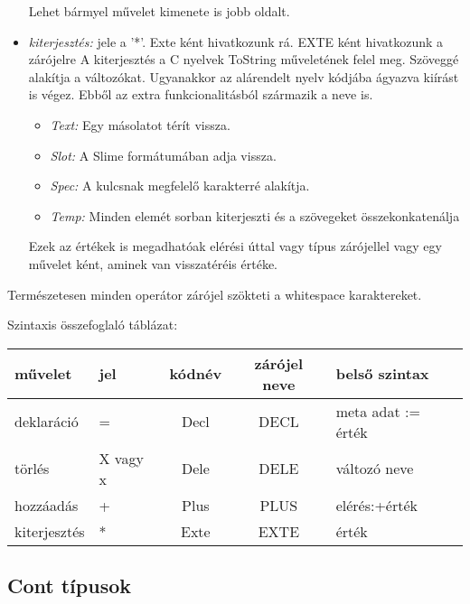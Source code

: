 \begin{itemize}
Lehet bármyel művelet kimenete is jobb oldalt.
\item \emph{kiterjesztés:}
jele a '*'.
Exte ként hivatkozunk rá.
EXTE ként hivatkozunk a zárójelre
A kiterjesztés a C nyelvek ToString műveletének felel meg. 
Szöveggé alakítja a változókat.
Ugyanakkor az alárendelt nyelv kódjába ágyazva kiírást is végez.
Ebből az extra funkcionalitásból származik a neve is.
\begin{itemize}
\item\emph{Text:} Egy másolatot térít vissza.
\item\emph{Slot:} A Slime formátumában adja vissza.
\item\emph{Spec:} A kulcsnak megfelelő karakterré alakítja.
\item\emph{Temp:} Minden elemét sorban kiterjeszti és a szövegeket összekonkatenálja
\end{itemize}
Ezek az értékek is megadhatóak elérési úttal vagy típus zárójellel vagy egy művelet ként, aminek van visszatéréis értéke.
\end{itemize}

Természetesen minden operátor zárójel szökteti a whitespace karaktereket.

Szintaxis összefoglaló táblázat:
\begin{center}
  \begin{tabular}{ | l | l | c | c | l |}
    \hline
    művelet		& jel	 	& kódnév 		& zárójel neve	& belső szintax		\\ \hline
    deklaráció	& = 		& Decl		 	& DECL			& meta adat := érték	\\ \hline
    törlés		& X vagy x	& Dele		 	& DELE			& változó neve		\\ \hline
    hozzáadás	& + 		& Plus		 	& PLUS			& elérés:+érték		\\ \hline
    kiterjesztés& * 		& Exte		 	& EXTE			& érték				\\
    \hline
  \end{tabular}
\end{center}


\subsection{Cont típusok}

